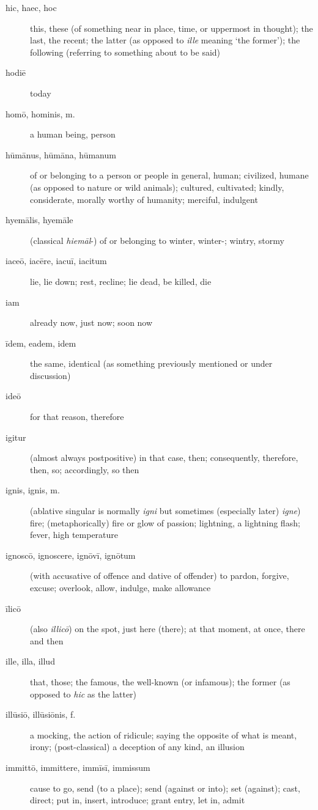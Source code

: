 \begin{description}
    \item[hic, haec, hoc] this, these (of something near in place, time, or uppermost in thought); the last, the recent; the latter (as opposed to \textit{ille} meaning `the former'); the following (referring to something about to be said)
    \item[hodiē] today
    \item[homō, hominis, m.] a human being, person
    \item[hūmānus, hūmāna, hūmanum] of or belonging to a person or people in general, human; civilized, humane (as opposed to nature or wild animals); cultured, cultivated; kindly, considerate, morally worthy of humanity; merciful, indulgent
    \item[hyemālis, hyemāle] (classical \textit{hiemāl}-) of or belonging to winter, winter-; wintry, stormy
    \item[iaceō, iacēre, iacuī, iacitum] lie, lie down; rest, recline; lie dead, be killed, die
    \item[iam] already now, just now; soon now
    \item[īdem, eadem, idem] the same, identical (as something previously mentioned or under discussion)
    \item[ideō] for that reason, therefore
    \item[igitur] (almost always postpositive) in that case, then; consequently, therefore, then, so; accordingly, so then
    \item[ignis, ignis, m.] (ablative singular is normally \textit{igni} but sometimes (especially later) \textit{igne}) fire; (metaphorically) fire or glow of passion; lightning, a lightning flash; fever, high temperature
    \item[ignoscō, ignoscere, ignōvī, ignōtum] (with accusative of offence and dative of offender) to pardon, forgive, excuse; overlook, allow, indulge, make allowance
    \item[īlicō] (also \textit{illicō}) on the spot, just here (there); at that moment, at once, there and then
    \item[ille, illa, illud] that, those; the famous, the well-known (or infamous); the former (as opposed to \textit{hic} as the latter)
    \item[illūsiō, illūsiōnis, f.] a mocking, the action of ridicule; saying the opposite of what is meant, irony; (post-classical) a deception of any kind, an illusion
    \item[immittō, immittere, immīsī, immissum] cause to go, send (to a place); send (against or into); set (against); cast, direct; put in, insert, introduce; grant entry, let in, admit

\end{description}

